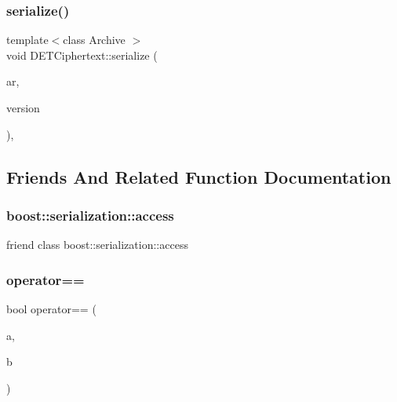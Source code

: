 \subsubsection{\texorpdfstring{serialize()}{serialize()}}
{\footnotesize\ttfamily template$<$class Archive $>$ \\
void D\+E\+T\+Ciphertext\+::serialize (\begin{DoxyParamCaption}\item[{Archive \&}]{ar,  }\item[{const unsigned int}]{version }\end{DoxyParamCaption})\hspace{0.3cm}{\ttfamily [inline]}, {\ttfamily [private]}}



\subsection{Friends And Related Function Documentation}
\mbox{\label{classDETCiphertext_ac98d07dd8f7b70e16ccb9a01abf56b9c}} 
\subsubsection{\texorpdfstring{boost\+::serialization\+::access}{boost::serialization::access}}
{\footnotesize\ttfamily friend class boost\+::serialization\+::access\hspace{0.3cm}{\ttfamily [friend]}}

\mbox{\label{classDETCiphertext_a5f7e97804478b1b2badc92d540797b73}} 
\subsubsection{\texorpdfstring{operator==}{operator==}}
{\footnotesize\ttfamily bool operator== (\begin{DoxyParamCaption}\item[{\hyperlink{classDETCiphertext}{D\+E\+T\+Ciphertext} \&}]{a,  }\item[{\hyperlink{classDETCiphertext}{D\+E\+T\+Ciphertext} \&}]{b }\end{DoxyParamCaption})\hspace{0.3cm}{\ttfamily [friend]}}

